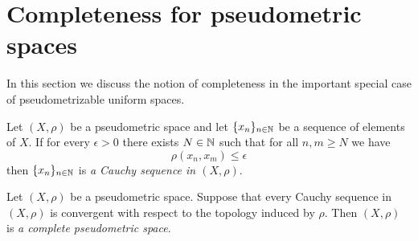 \section{Completeness for pseudometric spaces}
\noindent
In this section we discuss the notion of completeness in the important special case of pseudometrizable uniform spaces.

\begin{definition}
Let $(X,\rho)$ be a pseudometric space and let $\{x_n\}_{n\in {\mathbb N}}$ be a sequence of elements of $X$. If for every $\epsilon > 0$ there exists $N\in {\mathbb N}$ such that for all $n,m\geq N$ we have
$$\rho(x_n,x_m) \leq \epsilon$$
then $\{x_n\}_{n\in {\mathbb N}}$ is \textit{a Cauchy sequence in $(X,\rho)$}.
\end{definition}

\begin{definition}
Let $(X,\rho)$ be a pseudometric space. Suppose that every Cauchy sequence in $(X,\rho)$ is convergent with respect to the topology induced by $\rho$. Then $(X,\rho)$ is \textit{a complete pseudometric space}. 
\end{definition}

